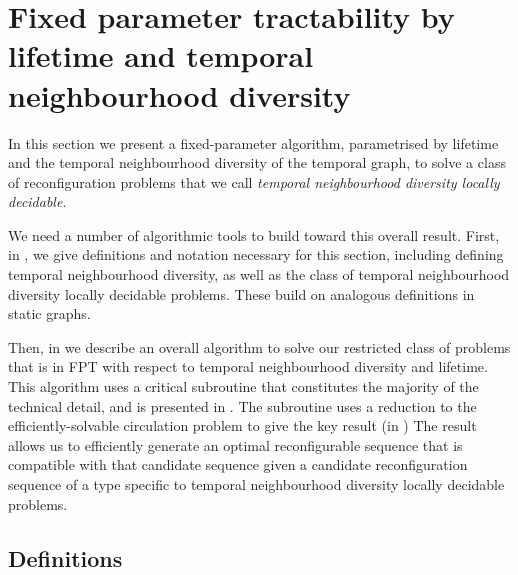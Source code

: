 \section{Fixed parameter tractability by lifetime and temporal neighbourhood diversity}
\label{sec:ndiversity}
\newcommand{\tndg}[1][\mathcal{G}]{\ensuremath{TND_{#1}}\xspace}
\newcommand{\ndg}[1][\mathcal{G}]{\ensuremath{ND_{#1}}\xspace}
In this section we present a fixed-parameter algorithm, parametrised by lifetime and the temporal neighbourhood diversity of the temporal graph, to solve a class of reconfiguration problems that we call \emph{temporal neighbourhood diversity locally decidable}. 

We need a number of algorithmic tools to build toward this overall result.  First, in , we give definitions and notation necessary for this section, including defining temporal neighbourhood diversity, as well as the class of temporal neighbourhood diversity locally decidable problems. These build on analogous definitions in static graphs. 

Then, in  we describe an overall algorithm to solve our restricted class of problems that is in FPT with respect to temporal neighbourhood diversity and lifetime. This algorithm uses a critical subroutine that constitutes the majority of the technical detail, and is presented in .  The subroutine uses a reduction to the efficiently-solvable circulation problem to give the key result (in ) The result allows us to efficiently generate an optimal reconfigurable sequence that is compatible with that candidate sequence given a candidate reconfiguration sequence of a type specific to temporal neighbourhood diversity locally decidable problems. 




\subsection{Definitions}
\label{subsec:definitions}


